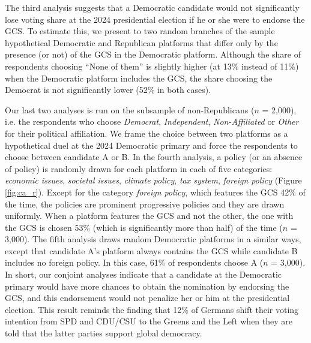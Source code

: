 The third analysis suggests that a Democratic candidate would not significantly lose voting share at the 2024 presidential election if he or she were to endorse the GCS. To estimate this, we present to two random branches of the sample hypothetical Democratic and Republican platforms that differ only by the presence (or not) of the GCS in the Democratic platform. Although the share of respondents choosing ``None of them'' is slightly higher (at 13\% instead of 11\%) when the Democratic platform includes the GCS, the share choosing the Democrat is not significantly lower (52\% in both cases). 

Our last two analyses is run on the subsample of non-Republicans ($n$ = 2,000), i.e. the respondents who choose \textit{Democrat}, \textit{Independent}, \textit{Non-Affiliated} or \textit{Other} for their political affiliation. We frame the choice between two platforms as a hypothetical duel at the 2024 Democratic primary and force the respondents to choose between candidate A or B. In the fourth analysis, a policy (or an absence of policy) is randomly drawn for each platform in each of five categories: \textit{economic issues}, \textit{societal issues}, \textit{climate policy}, \textit{tax system}, \textit{foreign policy} (Figure \ref{fig:ca_r}). Except for the category \textit{foreign policy}, which features the GCS 42\% of the time, the policies are prominent progressive policies and they are drawn uniformly. %
When a platform features the GCS and not the other, the one with the GCS is chosen 53\% (which is significantly more than half) of the time ($n$ = 3,000). %
The fifth analysis draws random Democratic platforms in a similar ways, except that candidate A's platform always contains the GCS while candidate B includes no foreign policy. In this case, 61\% of respondents choose A ($n$ = 3,000). In short, our conjoint analyses indicate that a candidate at the Democratic primary would have more chances to obtain the nomination by endorsing the GCS, and this endorsement would not penalize her or him at the presidential election. This result reminds the finding that 12\% of Germans shift their voting intention from SPD and CDU/CSU to the Greens and the Left when they are told that the latter parties support global democracy.\cite{ghassim_who_2020}

